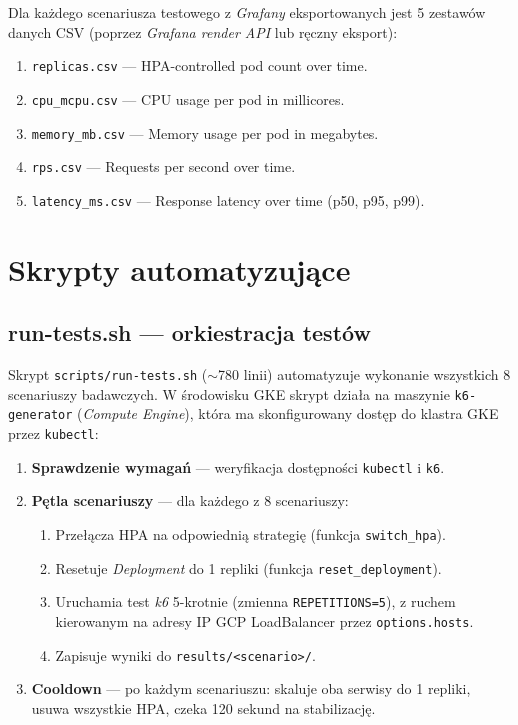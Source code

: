 Dla każdego scenariusza testowego z \textit{Grafany} eksportowanych jest 5 zestawów danych CSV (poprzez \textit{Grafana render API} lub ręczny eksport):
\begin{enumerate}
  \item \texttt{replicas.csv} — HPA-controlled pod count over time.
  \item \texttt{cpu\_mcpu.csv} — CPU usage per pod in millicores.
  \item \texttt{memory\_mb.csv} — Memory usage per pod in megabytes.
  \item \texttt{rps.csv} — Requests per second over time.
  \item \texttt{latency\_ms.csv} — Response latency over time (p50, p95, p99).
\end{enumerate}

\section{Skrypty automatyzujące}

\subsection{run-tests.sh — orkiestracja testów}

Skrypt \texttt{scripts/run-tests.sh} ($\sim$780 linii) automatyzuje wykonanie wszystkich 8 scenariuszy badawczych. W środowisku GKE skrypt działa na maszynie \texttt{k6-generator} (\textit{Compute Engine}), która ma skonfigurowany dostęp do klastra GKE przez \texttt{kubectl}:

\begin{enumerate}
  \item \textbf{Sprawdzenie wymagań} — weryfikacja dostępności \texttt{kubectl} i \texttt{k6}.
  \item \textbf{Pętla scenariuszy} — dla każdego z 8 scenariuszy:
    \begin{enumerate}
      \item Przełącza HPA na odpowiednią strategię (funkcja \texttt{switch\_hpa}).
      \item Resetuje \textit{Deployment} do 1 repliki (funkcja \texttt{reset\_deployment}).
      \item Uruchamia test \textit{k6} 5-krotnie (zmienna \texttt{REPETITIONS=5}), z ruchem kierowanym na adresy IP GCP LoadBalancer przez \texttt{options.hosts}.
      \item Zapisuje wyniki do \texttt{results/<scenario>/}.
    \end{enumerate}
  \item \textbf{Cooldown} — po każdym scenariuszu: skaluje oba serwisy do 1 repliki, usuwa wszystkie HPA, czeka 120 sekund na stabilizację.
\end{enumerate}

